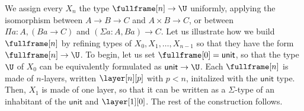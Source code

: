 \documentclass[10pt]{art.cls/art}
\newcommand{\unittype}{\ensuremath{\mathsf{unit}}}
\begin{document}
We assign every $X_n$ the type $\fullframe[n] \rightarrow \U$ uniformly, applying the isomorphism between $A \rightarrow B \rightarrow C$ and $A \times B \rightarrow C$, or between $\Pi a : A, (B a \rightarrow C)$ and $(\Sigma a : A, B a) \rightarrow C$. Let us illustrate how we build $\fullframe[n]$ by refining types of $X_0, X_1, \ldots, X_{n - 1}$ so that they have the form $\fullframe[n] \rightarrow \U$. To begin, let us set $\fullframe[0] = \unittype$, so that the type $\U$ of $X_0$ can be equivalently formulated as $\unittype \rightarrow \U$. Each $\fullframe[n]$ is made of $n$-layers, written $\layer[n][p]$ with $p < n$, initalized with the $\unittype$ type. Then, $X_1$ is made of one layer, so that it can be written as a $\Sigma$-type of an inhabitant of the $\unittype$ and $\layer[1][0]$. The rest of the construction follows.
\end{document}
